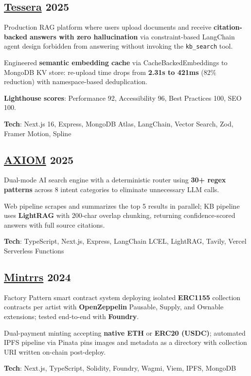 \documentclass[letter,10pt]{article}
\begin{document}
\subsection{{\href{https://github.com/JustUzair/Tessera-RAG-AI}{Tessera} \hfill 2025}}
\begin{zitemize}
  \item Production RAG platform where users upload documents and receive \textbf{citation-backed answers with zero hallucination} via constraint-based LangChain agent design forbidden from answering without invoking the \texttt{kb\_search} tool.
  \item Engineered \textbf{semantic embedding cache} via CacheBackedEmbeddings to MongoDB KV store: re-upload time drops from \textbf{2.31s to 421ms} (82\% reduction) with namespace-based deduplication.
  \item \textbf{Lighthouse scores}: Performance 92, Accessibility 96, Best Practices 100, SEO 100.
  \item \textbf{Tech}: Next.js 16, Express, MongoDB Atlas, LangChain, Vector Search, Zod, Framer Motion, Spline
\end{zitemize}

\subsection{{\href{https://github.com/JustUzair/axiom-lcel-rag}{AXIOM} \hfill 2025}}
\begin{zitemize}
  \item Dual-mode AI search engine with a deterministic router using \textbf{30+ regex patterns} across 8 intent categories to eliminate unnecessary LLM calls.
  \item Web pipeline scrapes and summarizes the top 5 results in parallel; KB pipeline uses \textbf{LightRAG} with 200-char overlap chunking, returning confidence-scored answers with full source citations.
  \item \textbf{Tech}: TypeScript, Next.js, Express, LangChain LCEL, LightRAG, Tavily, Vercel Serverless Functions
\end{zitemize}

\subsection{{\href{https://github.com/JustUzair/NFT-Generator}{Mintrrs} \hfill 2024}}
\begin{zitemize}
  \item Factory Pattern smart contract system deploying isolated \textbf{ERC1155} collection contracts per artist with \textbf{OpenZeppelin} Pausable, Supply, and Ownable extensions; tested end-to-end with \textbf{Foundry}.
  \item Dual-payment minting accepting \textbf{native ETH} or \textbf{ERC20 (USDC)}; automated IPFS pipeline via Pinata pins images and metadata as a directory with collection URI written on-chain post-deploy.
  \item \textbf{Tech}: Next.js, TypeScript, Solidity, Foundry, Wagmi, Viem, IPFS, MongoDB
\end{zitemize}
\end{document}
